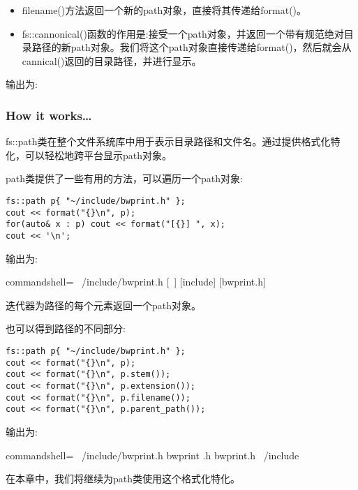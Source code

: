 \begin{itemize}
\begin{itemize}
\item 
filename()方法返回一个新的path对象，直接将其传递给format()。

\item 
fs::cannonical()函数的作用是:接受一个path对象，并返回一个带有规范绝对目录路径的新path对象。我们将这个path对象直接传递给format()，然后就会从cannical()返回的目录路径，并进行显示。
\end{itemize}

输出为:


\end{itemize}

\subsubsection{How it works…}

fs::path类在整个文件系统库中用于表示目录路径和文件名。通过提供格式化特化，可以轻松地跨平台显示path对象。

path类提供了一些有用的方法，可以遍历一个path对象:

\begin{lstlisting}[style=styleCXX]
fs::path p{ "~/include/bwprint.h" };
cout << format("{}\n", p);
for(auto& x : p) cout << format("[{}] ", x);
cout << '\n';
\end{lstlisting}

输出为:

\begin{tcblisting}{commandshell={}}
~/include/bwprint.h
[~] [include] [bwprint.h]
\end{tcblisting}

迭代器为路径的每个元素返回一个path对象。

也可以得到路径的不同部分:

\begin{lstlisting}[style=styleCXX]
fs::path p{ "~/include/bwprint.h" };
cout << format("{}\n", p);
cout << format("{}\n", p.stem());
cout << format("{}\n", p.extension());
cout << format("{}\n", p.filename());
cout << format("{}\n", p.parent_path());
\end{lstlisting}

输出为:

\begin{tcblisting}{commandshell={}}
~/include/bwprint.h
bwprint
.h
bwprint.h
~/include
\end{tcblisting}

在本章中，我们将继续为path类使用这个格式化特化。




